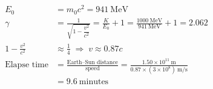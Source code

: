 \begin{align*}
E_0 &= m_0 c^2 = 941~\mathrm{MeV} \tag*{(20 points)}\\
\gamma &= \frac{1}{\sqrt{1 - \dfrac{v^2}{c^2}}}
  = \frac{K}{E_0} + 1
  = \frac{1000~\mathrm{MeV}}{941~\mathrm{MeV}} + 1 = 2.062 \tag*{(20 points)}\\
1 - \frac{v^2}{c^2} &\approx \frac{1}{4}
  \;\Rightarrow\; v \approx 0.87c \tag*{(30 points)}\\
\text{Elapse time} &= \frac{\text{Earth--Sun distance}}{\text{speed}}
  = \frac{1.50 \times 10^{11}~\mathrm{m}}
         {0.87 \times (3 \times 10^{8})~\mathrm{m/s}}\\
  &= 9.6~\text{minutes} \tag*{(30 points)}
\end{align*}

